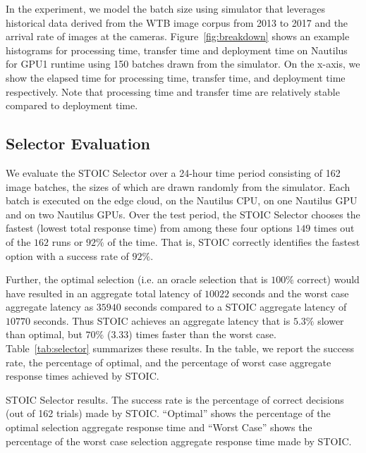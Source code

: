 In the experiment, we model the batch size using simulator that leverages historical data derived from the WTB image corpus from 2013 to 2017 and the arrival rate of images at the cameras. Figure~\ref{fig:breakdown} shows an example histograms for processing time, transfer time and deployment time on Nautilus for GPU1 runtime using 150 batches drawn from the simulator. On the x-axis, we show the elapsed time for processing time, transfer time, and deployment time respectively.  Note that processing time and transfer time are relatively stable compared to deployment time. 

\subsection{Selector Evaluation}

We evaluate the STOIC Selector over a 24-hour time period consisting of 162 image batches, the sizes of which are drawn randomly from the simulator. Each batch is executed on the edge cloud, on the Nautilus CPU, on one Nautilus GPU and on two Nautilus GPUs. Over the test period, the STOIC Selector chooses the fastest (lowest total response time) from among these four options $149$ times out of the $162$ runs or $92\%$ of the time. That is, STOIC correctly identifies the fastest option with a success rate of $92\%$.

Further, the optimal selection (i.e. an oracle selection that is $100\%$ correct) would have resulted in an aggregate total latency of $10022$ seconds and the worst case aggregate latency as $35940$ seconds compared to a STOIC aggregate latency of $10770$ seconds.  Thus STOIC achieves an aggregate latency that is $5.3\%$ slower than optimal, but $70\%$ ($3.33$) times faster than the worst case. Table~\ref{tab:selector} summarizes these results. In the table, we report the success rate, the percentage of optimal, and the percentage of worst case aggregate response times achieved by STOIC. 

\begin{table}[t] 
\begin{centering}
\captionsetup{justification=centering}

\end{centering}
\caption{
STOIC Selector results. The success rate is the percentage of correct decisions
(out of 162 trials) made by STOIC.  ``Optimal'' shows the percentage of the
optimal selection aggregate response time and ``Worst Case'' shows the percentage of the worst case 
selection aggregate response time made by STOIC.}
\label{tab:selector}
\end{table}

